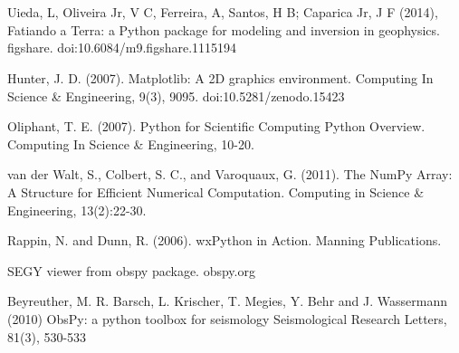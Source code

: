 \documentclass[a4paper,12pt,english]{sphinxmanual}
\begin{document}
\chapter{}
\label{\detokenize{tutorial::doc}}\label{\detokenize{tutorial:tutorial}}

\chapter{}
\label{\detokenize{contribute::doc}}\label{\detokenize{contribute:contribute}}\label{\detokenize{contribute:contibute}}

\chapter{}
\label{\detokenize{references:references}}\label{\detokenize{references:id1}}\label{\detokenize{references::doc}}

Uieda, L, Oliveira Jr, V C, Ferreira, A, Santos, H B; Caparica Jr, J F (2014), Fatiando a Terra: a Python package for
modeling and inversion in geophysics. figshare. doi:10.6084/m9.figshare.1115194


Hunter, J. D. (2007). Matplotlib: A 2D graphics environment. Computing In Science \& Engineering, 9(3),
90\textendash{}95. doi:10.5281/zenodo.15423


Oliphant, T. E. (2007). Python for Scientific Computing Python Overview. Computing In Science \& Engineering, 10-20.


van der Walt, S., Colbert, S. C., and Varoquaux, G. (2011). The NumPy Array: A Structure for Efficient
Numerical Computation. Computing in Science \& Engineering, 13(2):22-30.


Rappin, N. and Dunn, R. (2006). wxPython in Action. Manning Publications.


SEGY viewer from obspy package. obspy.org

Beyreuther, M. R. Barsch, L. Krischer, T. Megies, Y. Behr and J. Wassermann (2010) ObsPy: a python toolbox for
seismology Seismological Research Letters, 81(3), 530-533
\end{document}
